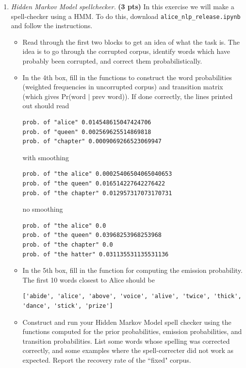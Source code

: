 \documentclass{article}
\newcommand{\showpoints}[1]{\textbf{(#1)}}
\begin{document}
\begin{enumerate}
\item \emph{Hidden Markov Model spellchecker.} \showpoints{3 pts}
In this exercise we will make a spell-checker using a HMM. To do this, download \texttt{alice\_nlp\_release.ipynb} and follow the instructions.

\begin{itemize}
\item Read through the first two blocks to get an idea of what the task is. The idea is to go through the corrupted corpus, identify words which have probably been corrupted, and correct them probabilistically. 

\item In the 4th box, fill in the functions to construct the word probabilities (weighted frequencies in uncorrupted corpus) and transition matrix (which gives Pr(word $|$ prev word)). If done correctly, the lines printed out should read 

\begin{verbatim}
prob. of "alice" 0.014548615047424706
prob. of "queen" 0.002569625514869818
prob. of "chapter" 0.0009069266523069947
\end{verbatim}

with smoothing

\begin{verbatim}
prob. of "the alice" 0.00025406504065040653
prob. of "the queen" 0.016514227642276422
prob. of "the chapter" 0.012957317073170731
\end{verbatim}

no smoothing

\begin{verbatim}
prob. of "the alice" 0.0
prob. of "the queen" 0.03968253968253968
prob. of "the chapter" 0.0
prob. of "the hatter" 0.031135531135531136
\end{verbatim}

\item In the 5th box, fill in the function for computing the emission probability. The first 10 words closest to Alice should be 

\begin{verbatim}
['abide', 'alice', 'above', 'voice', 'alive', 'twice', 'thick', 'dance', 'stick', 'prize']
\end{verbatim}

\item Construct and run your Hidden Markov Model spell checker using the functions computed for the prior probabilities, emission probabilities, and transition probabilities. List some words whose spelling was corrected correctly, and some examples where the spell-correcter did not work as expected. Report the recovery rate of the ``fixed" corpus.




\end{itemize}



\end{enumerate}
\end{document}
